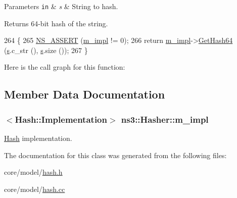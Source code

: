 \begin{DoxyParams}[1]{Parameters}
\mbox{\tt in}  & {\em s} & String to hash. \\
\hline
\end{DoxyParams}
\begin{DoxyReturn}{Returns}
64-\/bit hash of the string. 
\end{DoxyReturn}

\begin{DoxyCode}
264 \{
265   \hyperlink{assert_8h_a6dccdb0de9b252f60088ce281c49d052}{NS\_ASSERT} (\hyperlink{classns3_1_1Hasher_a33ed78e6b2e454d98197339c75423883}{m\_impl} != 0);
266   \textcolor{keywordflow}{return} \hyperlink{classns3_1_1Hasher_a33ed78e6b2e454d98197339c75423883}{m\_impl}->\hyperlink{classns3_1_1Hash_1_1Implementation_ae11335959394d22427d81abfa520106a}{GetHash64}  (\hyperlink{generate__test__data__lte__sinr_8m_ad83eeb3a142285d1243a08c6b7026df8}{s}.c\_str (), \hyperlink{generate__test__data__lte__sinr_8m_ad83eeb3a142285d1243a08c6b7026df8}{s}.size ());
267 \}
\end{DoxyCode}


Here is the call graph for this function\+:




\subsection{Member Data Documentation}
\subsubsection[{\texorpdfstring{m\+\_\+impl}{m_impl}}]{$<${\bf Hash\+::\+Implementation}$>$ ns3\+::\+Hasher\+::m\+\_\+impl\hspace{0.3cm}{\ttfamily [private]}}\hypertarget{classns3_1_1Hasher_a33ed78e6b2e454d98197339c75423883}{}\label{classns3_1_1Hasher_a33ed78e6b2e454d98197339c75423883}
\hyperlink{namespacens3_1_1Hash}{Hash} implementation. 

The documentation for this class was generated from the following files\+:\begin{DoxyCompactItemize}
\item 
core/model/\hyperlink{hash_8h}{hash.\+h}\item 
core/model/\hyperlink{hash_8cc}{hash.\+cc}\end{DoxyCompactItemize}
